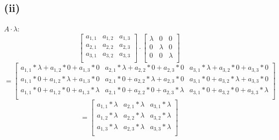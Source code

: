 \documentclass{article}
\begin{document}
\subsection{(ii)}
$A \cdot \lambda$:
\[
\begin{bmatrix}
    a_{1,1} & a_{1,2} & a_{1,3}\\
    a_{2,1} & a_{2,2} & a_{2,3} \\
    a_{3,1} & a_{3,2} &a_{3,3}\\
\end{bmatrix} \cdot 
\begin{bmatrix}
\lambda & 0 & 0 \\
0 & \lambda & 0 \\
0 & 0 & \lambda \\
\end{bmatrix}\]  \[ = 
\begin{bmatrix}
    a_{1,1}*\lambda + a_{1,2}*0 + a_{1,3}*0 & a_{2,1}*\lambda + a_{2,2}*0 + a_{2,3}*0 & a_{3,1}*\lambda + a_{3,2}*0 + a_{3,3}*0\\
    a_{1,1}*0 + a_{1,2}*\lambda + a_{1,3}*0& a_{2,1}*0 + a_{2,2}*\lambda + a_{2,3}*0& a_{3,1}*0 + a_{3,2}*\lambda + a_{3,3}*0\\
    a_{1,1}*0 + a_{1,2}*0 + a_{1,3}*\lambda& a_{2,1}*0 + a_{2,2}*0 + a_{2,3}*\lambda & a_{3,1}*0 + a_{3,2}*0 + a_{3,3}*\lambda\\
\end{bmatrix}\]\[ =
\begin{bmatrix}
 a_{1,1}*\lambda& a_{2,1}*\lambda& a_{3,1}*\lambda\\
a_{1,2}*\lambda& a_{2,2}*\lambda& a_{3,2}*\lambda\\
 a_{1,3}*\lambda&a_{2,3}*\lambda & a_{3,3}*\lambda\\
\end{bmatrix}
\]
\end{document}
